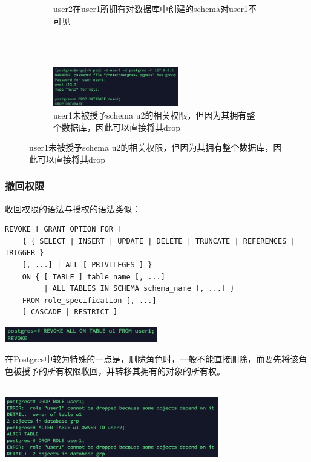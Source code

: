 \begin{figure}
\begin{subfigure}[b]{0.8\textwidth}
		\caption{user2在user1所拥有对数据库中创建的schema对user1不可见}
	\end{subfigure}
	\\~\\
	\begin{subfigure}[b]{0.8\textwidth}
		\centerline{\includegraphics[width=0.6\textwidth]{./pic/ddpu1.png}}
		\caption{user1未被授予schema u2的相关权限，但因为其拥有整个数据库，因此可以直接将其drop}
	\end{subfigure}
	\label{fig:visual_smap}
\end{figure}
\pagebreak


\subsubsection{撤回权限}
收回权限的语法与授权的语法类似：
\begin{lstlisting}
REVOKE [ GRANT OPTION FOR ]
    { { SELECT | INSERT | UPDATE | DELETE | TRUNCATE | REFERENCES | TRIGGER }
    [, ...] | ALL [ PRIVILEGES ] }
    ON { [ TABLE ] table_name [, ...]
         | ALL TABLES IN SCHEMA schema_name [, ...] }
    FROM role_specification [, ...]
    [ CASCADE | RESTRICT ]
\end{lstlisting}
\vspace{-2em}
\centerline{\includegraphics[width=0.5\textwidth]{pic/rvk}}
\par 在Postgres中较为特殊的一点是，删除角色时，一般不能直接删除，而要先将该角色被授予的所有权限收回，并转移其拥有的对象的所有权。\\~\\
\centerline{\includegraphics[width=0.7\textwidth]{pic/fail2dr}}

